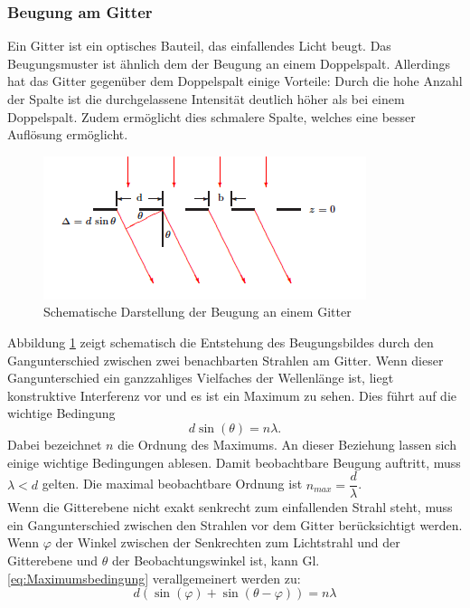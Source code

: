 \documentclass[12pt,a4paper]{article}
\begin{document}
\subsubsection{Beugung am Gitter}
Ein Gitter ist ein optisches Bauteil, das einfallendes Licht beugt. Das Beugungsmuster ist ähnlich dem der Beugung an einem Doppelspalt. Allerdings hat das Gitter gegenüber dem Doppelspalt einige Vorteile: Durch die hohe Anzahl der Spalte ist die durchgelassene Intensität deutlich höher als bei einem Doppelspalt. Zudem ermöglicht dies schmalere Spalte, welches eine besser Auflösung ermöglicht.\\
\begin{figure}
\begin{center}
\includegraphics[scale=1.2]{Bilder/Gitterbeugung_Schema.PNG}
\end{center}
\caption[Gitterbeugung Schema]{Schematische Darstellung der Beugung an einem Gitter}
\label{fig:Gitterbeugung_Schema}
\end{figure}
Abbildung \ref{fig:Gitterbeugung_Schema} zeigt schematisch die Entstehung des Beugungsbildes durch den Gangunterschied zwischen zwei benachbarten Strahlen am Gitter. Wenn dieser Gangunterschied ein ganzzahliges Vielfaches der Wellenlänge ist, liegt konstruktive Interferenz vor und es ist ein Maximum zu sehen. Dies führt auf die wichtige Bedingung
\begin{equation}
d \sin (\theta) = n \lambda.
\label{eq:Maximumsbedingung}
\end{equation}
Dabei bezeichnet $n$ die Ordnung des Maximums. An dieser Beziehung lassen sich einige wichtige Bedingungen ablesen. Damit beobachtbare Beugung auftritt, muss $\lambda < d$ gelten. Die maximal beobachtbare Ordnung ist $n_{max} = \dfrac{d}{\lambda}$. \\
Wenn die Gitterebene nicht exakt senkrecht zum einfallenden Strahl steht, muss ein Gangunterschied zwischen den Strahlen vor dem Gitter berücksichtigt werden. Wenn $\varphi$ der Winkel zwischen der Senkrechten zum Lichtstrahl und der Gitterebene und $\theta$ der Beobachtungswinkel ist, kann Gl. \ref{eq:Maximumsbedingung} verallgemeinert werden zu:
\begin{equation}
d(\sin(\varphi) + \sin(\theta - \varphi)) = n \lambda
\label{eq:VerallgemeinerteMaximumsbedingung}
\end{equation}
\end{document}
